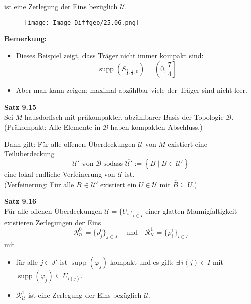 \documentclass[fleqn, 12pt, letterpaper]{article}
\begin{document}
ist eine Zerlegung der Eins bezüglich $\mathcal{U}$.
      \begin{figure}[H]
    \centering
    \texttt{[image: Image Diffgeo/25.06.png]}
 \end{figure}
\textbf{Bemerkung:}
\begin{itemize}
    \item Dieses Beispiel zeigt, dass Träger nicht immer kompakt sind:
    \[
    \operatorname{supp} \left( S_{\frac{5}{4}, \frac{7}{4}, 0} \right) = \left(0, \frac{7}{4}\right]
    \]
    
    \item Aber man kann zeigen: maximal abzählbar viele der Träger sind nicht leer.
\end{itemize}

\textbf{Satz 9.15}\\
Sei $M$ hausdorffsch mit präkompakter, abzählbarer Basis der Topologie $\mathcal{B}$.\\

\textnormal{(Präkompakt: Alle Elemente in $\mathcal{B}$ haben kompakten Abschluss.)}

Dann gilt: Für alle offenen Überdeckungen $\mathcal{U}$ von $M$ existiert eine Teilüberdeckung 
\[
\mathcal{U}' \text{ von } \mathcal{B} \text{ sodass } \overline{\mathcal{U}'} := \left\{ \overline{B} \mid B \in \mathcal{U}' \right\}
\]
eine lokal endliche Verfeinerung von $\mathcal{U}$ ist.\\

\textnormal{(Verfeinerung: Für alle $B \in \mathcal{U}'$ existiert ein $U \in \mathcal{U}$ mit $\overline{B} \subseteq U$.)}
\vspace{1em}

\textbf{Satz 9.16}\\
Für alle offenen Überdeckungen $\mathcal{U} = \{U_i\}_{i \in I}$ einer glatten Mannigfaltigkeit existieren
Zerlegungen der Eins
\[
\mathcal{R}^0_{\mathcal{U}} = \{\rho_j^0\}_{j \in J'} \quad \text{und} \quad \mathcal{R}^1_{\mathcal{U}} = \{\rho^1_i\}_{i \in I}
\]
mit
\begin{itemize}
    \item für alle $j \in J'$ ist $\operatorname{supp}(\varphi_j)$ kompakt und es gilt: $\exists \, i(j) \in I$ mit $\operatorname{supp}(\varphi_j) \subseteq U_{i(j)}$.
    
    \item $\mathcal{R}^1_{\mathcal{U}}$ ist eine Zerlegung der Eins bezüglich $\mathcal{U}$.
\end{itemize}
\end{document}
